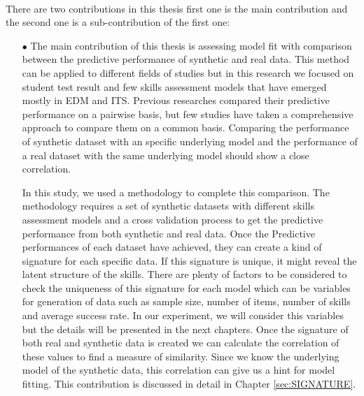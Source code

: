 \paragraph{}There are two contributions in this thesis \DIFdelbegin {}\DIFdelend \DIFaddbegin {}\DIFaddend first one is the main contribution and the second one is a sub-contribution of the first one:
\DIFdelbegin %
\DIFdelend \DIFaddbegin \begin{itemize}
\item[$\bullet$] \DIFaddend The main contribution of this thesis is assessing model fit with comparison between the predictive performance of synthetic and real data. This method can be applied to different fields of studies but in this research we focused on student test result and few skills assessment models that have emerged mostly in EDM and ITS. Previous researches compared their predictive performance  on a pairwise basis, but few studies have taken a comprehensive approach to compare them on a common basis. Comparing the performance of synthetic dataset with an specific underlying model and the performance of a real dataset with the same underlying model should show a close correlation. 

In this study, we used a methodology to complete this comparison. The methodology requires a set of synthetic datasets with different skills assessment models and a cross validation process to get the predictive performance from both synthetic and real data. Once the Predictive performances of each dataset have achieved, they can create a kind of signature for each specific data. If this signature is unique, it might reveal the latent structure of the skills. There are plenty of factors to be considered to check the uniqueness of this signature for each model which can be variables for generation of data such as sample size, number of items, number of skills and average success rate. In our experiment, we will consider this variables but the details will be presented in the next chapters. Once the signature of both real and synthetic data is created we can calculate the correlation of these values to find a measure of similarity. Since we know the underlying model of the synthetic data, this correlation can give us a hint for model fitting. This contribution is discussed in detail in Chapter \ref{sec:SIGNATURE}.


\end{itemize}
